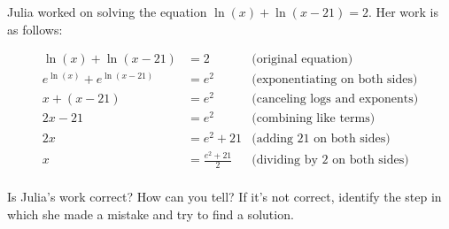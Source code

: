 \documentclass[noauthor,noinstructornotes]{ximera}
\begin{document}
\begin{problem}
Julia worked on solving the equation \(\ln(x) + \ln(x - 21) = 2\). Her
work is as follows:

\begin{align*}
\ln(x) + \ln(x - 21) & = 2 & \text{(original equation)}\\
e^{\ln(x)} + e^{\ln(x - 21)} & = e^2 & \text{(exponentiating on both sides)} \\
x + (x - 21) & = e^2 & \text{(canceling logs and exponents)}\\
2x - 21 & = e^2 & \text{(combining like terms)}\\
2x & = e^2 + 21 & \text{(adding 21 on both sides)}\\
x & = \frac{e^2 + 21}{2} & \text{(dividing by 2 on both sides)}\\
\end{align*}

Is Julia's work correct? How can you tell? If it's not correct, identify
the step in which she made a mistake and try to find a solution.
\end{problem}
\end{document}

